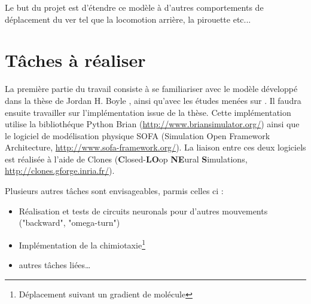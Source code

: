 Le but du projet est d'étendre ce modèle à d'autres comportements de déplacement du ver tel que la locomotion arrière, la pirouette etc...


\section{Tâches à réaliser} %
\label{sec:Tâches à réaliser}

La première partie du travail consiste à se familiariser avec le modèle développé dans la thèse de Jordan
H. Boyle \cite{Boyle2009}, ainsi qu'avec les études menées sur \celeg{}. Il faudra ensuite travailler sur
l'implémentation issue de la thèse. Cette implémentation utilise la bibliothéque Python Brian
(\url{http://www.briansimulator.org/}) ainsi que le logiciel de modélisation physique SOFA
(Simulation Open Framework Architecture, \url{http://www.sofa-framework.org/}). La liaison entre ces
deux logiciels est réalisée à l'aide de Clones (\textbf{C}losed-\textbf{LO}op \textbf{NE}ural \textbf{S}imulations,\\
\url{http://clones.gforge.inria.fr/}).

Plusieurs autres tâches sont envisageables, parmis celles ci :
\begin{itemize}
   \item Réalisation et tests de circuits neuronals pour d'autres mouvements ("backward", "omega-turn")
   \item Implémentation de la chimiotaxie\footnote{Déplacement suivant un gradient de molécule}
   \item autres tâches liées\dots
\end{itemize}




